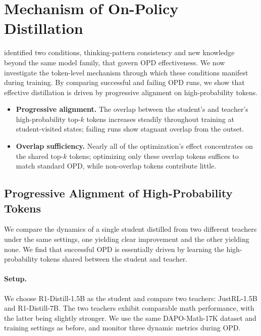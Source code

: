 \section{Mechanism of On-Policy Distillation}
\label{sec:mechanism}

 identified two conditions, thinking-pattern consistency and new knowledge beyond the same model family, that govern OPD effectiveness.
We now investigate the token-level mechanism through which these conditions manifest during training.
By comparing successful and failing OPD runs, we show that effective distillation is driven by progressive alignment on high-probability tokens.



\begin{tcolorbox}[takeawaysbox]
\begin{itemize}[topsep=0pt, partopsep=0pt, leftmargin=12pt, itemsep=0pt]
    \item \textbf{Progressive alignment.} The overlap between the student’s and teacher’s high-probability top-$k$ tokens increases steadily throughout training at student-visited states; failing runs show stagnant overlap from the outset.
    \item \textbf{Overlap sufficiency.} Nearly all of the optimization's effect concentrates on the shared top-$k$ tokens; optimizing only these overlap tokens suffices to match standard OPD, while non-overlap tokens contribute little.
\end{itemize}
\end{tcolorbox}

\subsection{Progressive Alignment of High-Probability Tokens}
\label{sec:alignment_high_prob}

We compare the dynamics of a single student distilled from two different teachers under the same settings, one yielding clear improvement and the other yielding none.
We find that successful OPD is essentially driven by learning the high-probability tokens shared between the student and teacher.

\paragraph{Setup.} We choose R1-Distill-1.5B as the student and compare two teachers: JustRL-1.5B and R1-Distill-7B.
The two teachers exhibit comparable math performance, with the latter being slightly stronger. We use the same DAPO-Math-17K dataset and training settings as before, and monitor three dynamic metrics during OPD.


